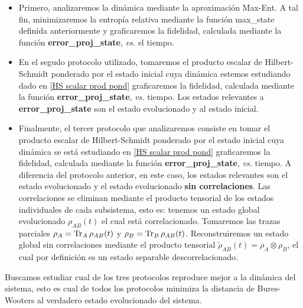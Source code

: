 \documentclass{report} %
\numberwithin{equation}{section}
\begin{document}
\begin{itemize}
    \item Primero, analizaremos la dinámica mediante la aproximación Max-Ent. A tal fin, minimizaremos la entropía relativa mediante la función max\_state definida anteriormente y graficaremos la fidelidad, calculada mediante la función \textbf{error\_proj\_state}, \textit{vs.} el tiempo.
    \item En el segudo protocolo utilizado, tomaremos el producto escalar de Hilbert-Schmidt ponderado por el estado inicial cuya dinámica estemos estudiando dado en \eqref{HS scalar prod pond} graficaremos la fidelidad, calculada mediante la función \textbf{error\_proj\_state}, \textit{vs.} tiempo.
    Los estados relevantes a \textbf{error\_proj\_state} son el estado evolucionado y al estado inicial. 
    \item Finalmente, el tercer protocolo que analizaremos consiste en tomar el producto escalar de Hilbert-Schmidt ponderado por el estado inicial cuya dinámica se está estudiando en \eqref{HS scalar prod pond} graficaremos la fidelidad, calculada mediante la función \textbf{error\_proj\_state}, \textit{vs.} tiempo. A diferencia del protocolo anterior, en este caso, los estados relevantes son el estado evolucionado 
    y el estado evolucionado \textbf{sin correlaciones}. Las correlaciones se eliminan mediante el producto tensorial de los estados individuales de cada subsistema, esto es: tenemos un estado global evolucionado $\rho_{AB}(t)$ el cual está correlacionado. Tomaremos las trazas parciales $\rho_A = \Tr_{A}\rho_{AB}(t) $ y $\rho_B = \Tr_{B}\rho_{AB}(t)$. Reconstruiremos un estado global sin correlaciones mediante el producto tensorial $\tilde{\rho}_{AB}(t)=\rho_A\otimes \rho_B$, el cual por definición es un estado separable descorrelacionado.
\end{itemize}

Buscamos estudiar cual de los tres protocolos reproduce mejor a la dinámica del sistema, esto es cual de todos los protocolos minimiza la distancia de Bures-Wooters al verdadero estado evolucionado del sistema.
\end{document}
